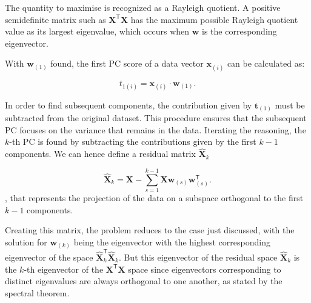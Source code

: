 The quantity to maximise is recognized as a Rayleigh quotient\cite{horn13}. A positive semidefinite matrix such as $\mathbf{X}^{\mathsf{T}} \mathbf{X}$ has the maximum possible Rayleigh quotient value as its largest eigenvalue, which occurs when $\mathbf{w}$ is the corresponding eigenvector\cite{parlett1998symmetric}.


With $\mathbf{w}_{(1)}$ found, the first PC score of a data vector $\mathbf{x}_{(i)}$ can be calculated as:

\begin{equation}
t_{1(i)} = \mathbf{x}_{(i)} \cdot \mathbf{w}_{(1)}.
\end{equation}

In order to find subsequent components, the contribution given by $\mathbf{t}_{(1)}$ must be subtracted from the original dataset. This procedure ensures that the subsequent PC focuses on the variance that remains in the data. Iterating the reasoning, the $k$-th PC is found by subtracting the contributions given by the first $k-1$ components. We can hence define a residual matrix $\mathbf{\hat{X}}_{k}$

\begin{equation}
\mathbf{\hat{X}}_{k} = \mathbf{X} - \sum_{s=1}^{k-1} \mathbf{X} \mathbf{w}_{(s)} \mathbf{w}_{(s)}^{\mathsf{T}}.\label{dim_red_tran}
\end{equation},
that represents the projection of the data on a subspace orthogonal to the first $k-1$ components.

Creating this matrix, the problem reduces to the case just discussed, with the solution for $\mathbf{w}_{(k)}$ being the eigenvector with the highest corresponding eigenvector of the space $\mathbf{\hat{X}}_{k}^\mathsf{T}\mathbf{\hat{X}}_{k}$. But this eigenvector of the residual space $\mathbf{\hat{X}}_{k}$ is the $k$-th  eigenvector of the $\mathbf{X}^{\mathsf{T}} \mathbf{X}$ space since eigenvectors corresponding to distinct eigenvalues are always orthogonal to one another, as stated by the spectral theorem.









